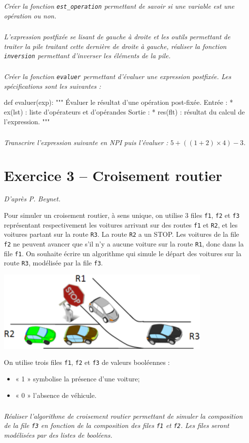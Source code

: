 \documentclass[10pt,fleqn]{article} %
\begin{document}
\begin{multicols}{2}
\subparagraph{}\textit{Créer la fonction \texttt{est\_operation} permettant de savoir si une variable est une opération ou non.}

\subparagraph{}\textit{L'expression postfixée se lisant de gauche à droite et les outils permettant de traiter la pile traitant cette dernière de droite à gauche, réaliser la fonction \texttt{inversion} permettant d'inverser les éléments de la pile.}


\subparagraph{}\textit{Créer la fonction \texttt{evaluer} permettant d'évaluer une expression postfixée. Les spécifications sont les suivantes :}

\begin{py}
\begin{python}
def evaluer(exp):
    """
    Évaluer le résultat d'une opération post-fixée.
    Entrée : 
     * ex(lst) : liste d'opérateurs et d'opérandes
    Sortie : 
     * res(flt) : résultat du calcul de l'expression.
    """
\end{python}
\end{py}

\subparagraph{}
\textit{Transcrire l'expression suivante en NPI puis l'évaluer : $5+\left(\left( 1+2\right)\times4 \right)-3$.}

\section*{Exercice 3 -- Croisement routier}
\setcounter{exo}{0}
\textit{D'après P. Beynet.}

Pour simuler un croisement routier, à sens unique, on utilise 3 files \texttt{f1}, \texttt{f2} et \texttt{f3} représentant respectivement les voitures arrivant sur des routes \texttt{f1} et \texttt{R2}, et les voitures partant sur la route \texttt{R3}.
La route \texttt{R2} a un STOP. Les voitures de la file \texttt{f2} ne peuvent avancer que s’il n’y a aucune voiture sur la route \texttt{R1}, donc dans la file \texttt{f1}. On souhaite écrire un algorithme qui simule le départ des voitures sur la route \texttt{R3}, modélisée par la file \texttt{f3}.
\begin{center}
\includegraphics[width=.8\linewidth]{images/file_01}
\end{center}
On utilise trois files \texttt{f1}, \texttt{f2} et \texttt{f3} de valeurs booléennes :
\begin{itemize}
\item  « 1 » symbolise la présence d’une voiture;
\item  « 0 » l’absence de véhicule.
\end{itemize}

\subparagraph{}
\textit{Réaliser l'algorithme de croisement routier permettant de simuler la composition de la file \texttt{f3} en fonction de la composition des files \texttt{f1} et \texttt{f2}. Les files seront modélisées par des listes de booléens.}

\end{multicols}
\end{document}
